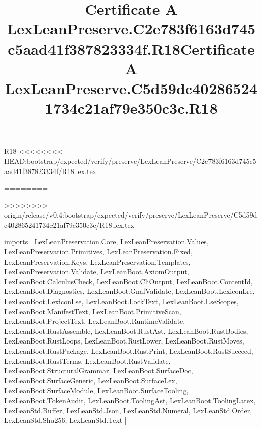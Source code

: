 \begin{lexlean}{R18}
<<<<<<<< HEAD:bootstrap/expected/verify/preserve/LexLeanPreserve/C2e783f6163d745c5aad41f387823334f/R18.lex.tex
\title{Certificate A LexLeanPreserve.C2e783f6163d745c5aad41f387823334f.R18}
========
\title{Certificate A LexLeanPreserve.C5d59dc402865241734c21af79e350c3c.R18}
>>>>>>>> origin/release/v0.4:bootstrap/expected/verify/preserve/LexLeanPreserve/C5d59dc402865241734c21af79e350c3c/R18.lex.tex
\begin{coremodule}
imports [
  LexLeanPreservation.Core,
  LexLeanPreservation.Values,
  LexLeanPreservation.Primitives,
  LexLeanPreservation.Fixed,
  LexLeanPreservation.Keys,
  LexLeanPreservation.Templates,
  LexLeanPreservation.Validate,
  LexLeanBoot.AxiomOutput,
  LexLeanBoot.CalculusCheck,
  LexLeanBoot.CliOutput,
  LexLeanBoot.ContentId,
  LexLeanBoot.Diagnostics,
  LexLeanBoot.GnafValidate,
  LexLeanBoot.LexiconLre,
  LexLeanBoot.LexiconLse,
  LexLeanBoot.LockText,
  LexLeanBoot.LseScopes,
  LexLeanBoot.ManifestText,
  LexLeanBoot.PrimitiveScan,
  LexLeanBoot.ProjectText,
  LexLeanBoot.RuntimeValidate,
  LexLeanBoot.RustAssemble,
  LexLeanBoot.RustAst,
  LexLeanBoot.RustBodies,
  LexLeanBoot.RustLoops,
  LexLeanBoot.RustLower,
  LexLeanBoot.RustMoves,
  LexLeanBoot.RustPackage,
  LexLeanBoot.RustPrint,
  LexLeanBoot.RustSucceed,
  LexLeanBoot.RustTerms,
  LexLeanBoot.RustValidate,
  LexLeanBoot.StructuralGrammar,
  LexLeanBoot.SurfaceDoc,
  LexLeanBoot.SurfaceGeneric,
  LexLeanBoot.SurfaceLex,
  LexLeanBoot.SurfaceModule,
  LexLeanBoot.SurfaceTooling,
  LexLeanBoot.TokenAudit,
  LexLeanBoot.ToolingAst,
  LexLeanBoot.ToolingLatex,
  LexLeanStd.Buffer,
  LexLeanStd.Json,
  LexLeanStd.Numeral,
  LexLeanStd.Order,
  LexLeanStd.Sha256,
  LexLeanStd.Text
]


\end{coremodule}
\end{lexlean}
